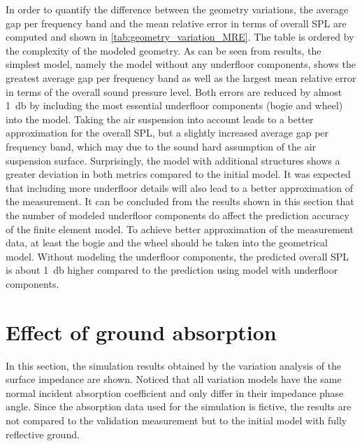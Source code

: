 In order to quantify the difference between the geometry variations, the average gap per frequency band and the mean relative error in terms of overall SPL are computed and shown in \cref{tab:geometry_variation_MRE}. The table is ordered by the complexity of the modeled geometry. As can be seen from results, the simplest model, namely the model without any underfloor components, shows the greatest average gap per frequency band as well as the largest mean relative error in terms of the overall sound pressure level. Both errors are reduced by almost \SI{1}{\decibel} by including the most essential underfloor components (bogie and wheel) into the model. Taking the air suspension into account leads to a better approximation for the overall SPL, but a slightly increased average gap per frequency band, which may due to the sound hard assumption of the air suspension surface. Surprisingly, the model with additional structures shows a greater deviation in both metrics compared to the initial model. It was expected that including more underfloor details will also lead to a better approximation of the measurement. It can be concluded from the results shown in this section that the number of modeled underfloor components do affect the prediction accuracy of the finite element model. To achieve better approximation of the measurement data, at least the bogie and the wheel should be taken into the geometrical model. Without modeling the underfloor components, the predicted overall SPL is about \SI{1}{\decibel} higher compared to the prediction using model with underfloor components.

\section{Effect of ground absorption}

In this section, the simulation results obtained by the variation analysis of the surface impedance are shown. Noticed that all variation models have the same normal incident absorption coefficient and only differ in their impedance phase angle. Since the absorption data used for the simulation is fictive, the results are not compared to the validation measurement but to the initial model with fully reflective ground.

